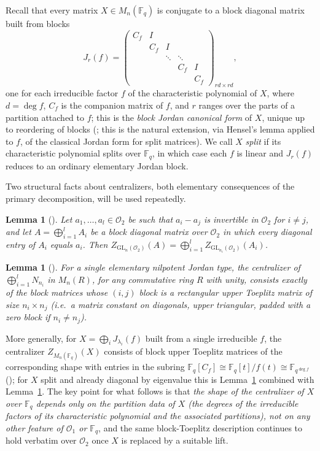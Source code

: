 \documentclass[11pt]{amsart}
\newtheorem{lemma}[theorem]{Lemma}
\theoremstyle{definition}
\newcommand{\GL}{\mathrm{GL}}
\newcommand{\Fq}{\mathbb{F}_q}
\begin{document}
	Recall that every matrix $X\in M_n(\Fq)$ is conjugate to a block diagonal
	matrix built from blocks
	\[
	J_r(f)=\begin{pmatrix}
		C_f & I & & & \\
		& C_f & I & & \\
		& & \ddots & \ddots & \\
		& & & C_f & I \\
		& & & & C_f
	\end{pmatrix}_{rd\times rd},
	\]
	one for each irreducible factor $f$ of the characteristic polynomial of
	$X$, where $d=\deg f$, $C_f$ is the companion matrix of $f$, and $r$ ranges
	over the parts of a partition attached to $f$; this is the \emph{block
		Jordan canonical form} of $X$, unique up to reordering of blocks
	(\cite[Theorem~2.3.10]{Thesis}; this is the natural extension, via Hensel's
	lemma applied to $f$, of the classical Jordan form for split matrices). We
	call $X$ \emph{split} if its characteristic polynomial splits over $\Fq$,
	in which case each $f$ is linear and $J_r(f)$ reduces to an ordinary
	elementary Jordan block.
	
	Two structural facts about centralizers, both elementary consequences of
	the primary decomposition, will be used repeatedly.
	
	\begin{lemma}[{\cite[Lemma~2.3.2]{Thesis}}]\label{lem:distinct-eigen}
		Let $a_1,\dots,a_l\in\mathcal O_2$ be such that $a_i-a_j$ is invertible in
		$\mathcal O_2$ for $i\neq j$, and let $A=\bigoplus_{i=1}^l A_i$ be a block
		diagonal matrix over $\mathcal O_2$ in which every diagonal entry of $A_i$
		equals $a_i$. Then $Z_{\GL_n(\mathcal O_2)}(A)=\bigoplus_{i=1}^l
		Z_{\GL_{n_i}(\mathcal O_2)}(A_i)$.
	\end{lemma}
	
	\begin{lemma}[{\cite[Lemma~2.3.4]{Thesis}}]\label{lem:toeplitz}
		For a single elementary nilpotent Jordan type, the centralizer of
		$\bigoplus_{i=1}^l N_{n_i}$ in $M_n(R)$, for any commutative ring $R$ with
		unity, consists exactly of the block matrices whose $(i,j)$ block is a
		\emph{rectangular upper Toeplitz matrix} of size $n_i\times n_j$ (i.e.\ a
		matrix constant on diagonals, upper triangular, padded with a zero block if
		$n_i\neq n_j$).
	\end{lemma}
	
	More generally, for $X=\bigoplus_i J_{\lambda_i}(f)$ built from a single
	irreducible $f$, the centralizer $Z_{M_n(\Fq)}(X)$ consists of block upper
	Toeplitz matrices of the corresponding shape with entries in the subring
	$\Fq[C_f]\cong \Fq[t]/f(t)\cong \mathbb F_{q^{\deg f}}$
	(\cite[Theorem~2.3.12]{Thesis}); for $X$ split and already diagonal by
	eigenvalue this is Lemma~\ref{lem:toeplitz} combined with
	Lemma~\ref{lem:distinct-eigen}. The key point for what follows is that
	\emph{the shape of the centralizer of $X$ over $\Fq$ depends only on the
		partition data of $X$ (the degrees of the irreducible factors of its
		characteristic polynomial and the associated partitions), not on any other
		feature of $\mathcal O_1$ or $\Fq$}, and the same block-Toeplitz
	description continues to hold verbatim over $\mathcal O_2$ once $X$ is
	replaced by a suitable lift.
	
\end{document}
